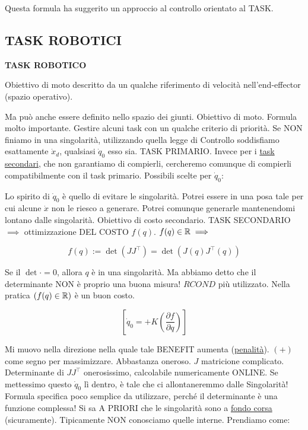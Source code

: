 Questa formula ha suggerito un approccio al controllo orientato al TASK.

\subsection{TASK ROBOTICI}

\begin{defn}{\textbf{TASK ROBOTICO}}

Obiettivo di moto descritto da un qualche riferimento di velocità nell'end-effector (spazio operativo).

\end{defn}

Ma può anche essere definito nello spazio dei giunti. Obiettivo di moto. Formula molto importante. Gestire alcuni task con un qualche criterio di priorità. Se NON finiamo in una singolarità, utilizzando quella legge di Controllo soddisfiamo esattamente $\dot{x}_d$, qualsiasi $\dot{q}_0$ esso sia. TASK PRIMARIO. Invece per i \underline{task secondari}, che non garantiamo di compierli, cercheremo comunque di compierli compatibilmente con il task primario. Possibili scelte per $\dot{q}_0$:

Lo spirito di $\dot{q}_0$ è quello di evitare le singolarità. Potrei essere in una posa tale per cui alcune $\dot{x}$ non le riesco a generare. Potrei comunque generarle mantenendomi lontano dalle singolarità. Obiettivo di costo secondario. TASK SECONDARIO $\implies$ ottimizzazione DEL COSTO $f(q)$. $f(q)\in\mathbb{R}\implies$

\[
	f(q) := \det{(JJ^\top)} = \det{(J(q)J^\top(q))}
\]

Se il $\det{\mathord{\cdot}}=0$, allora $q$ è in una singolarità. Ma abbiamo detto che il determinante NON è proprio una buona misura! $RCOND$ più utilizzato. Nella pratica $(f(q)\in\mathbb{R})$ è un buon costo.

\[
	[\dot{q}_0 = +K(\frac{\partial f}{\partial q})]
\]

Mi muovo nella direzione nella quale tale BENEFIT aumenta (\underline{penalità}). $(+)$ come segno per massimizzare. Abbastanza oneroso. $J$ matricione complicato. Determinante di $JJ^\top$ onerosissimo, calcolabile numericamente ONLINE. Se mettessimo questo $\dot{q}_0$ lì dentro, è tale che ci allontaneremmo dalle Singolarità! Formula specifica poco semplice da utilizzare, perché il determinante è una funzione complessa! Si sa A PRIORI che le singolarità sono a \underline{fondo corsa} (sicuramente). Tipicamente NON conosciamo quelle interne. Prendiamo come:

